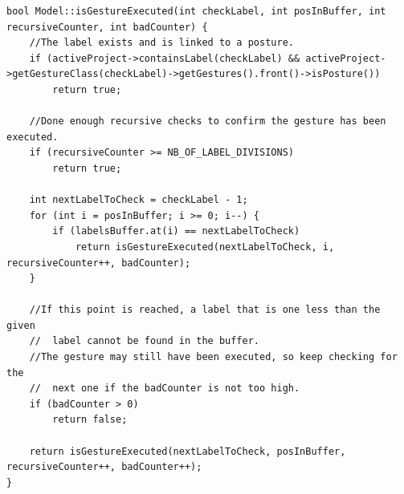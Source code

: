 \begin{lstlisting}[caption=method to verify if a gesture with given label is executed, label=code_gesture_executed]
bool Model::isGestureExecuted(int checkLabel, int posInBuffer, int recursiveCounter, int badCounter) {
	//The label exists and is linked to a posture.
	if (activeProject->containsLabel(checkLabel) && activeProject->getGestureClass(checkLabel)->getGestures().front()->isPosture())
		return true;

	//Done enough recursive checks to confirm the gesture has been executed.
	if (recursiveCounter >= NB_OF_LABEL_DIVISIONS)
		return true;

	int nextLabelToCheck = checkLabel - 1;
	for (int i = posInBuffer; i >= 0; i--) {
		if (labelsBuffer.at(i) == nextLabelToCheck)
			return isGestureExecuted(nextLabelToCheck, i, recursiveCounter++, badCounter);
	}

	//If this point is reached, a label that is one less than the given
	//	label cannot be found in the buffer.
	//The gesture may still have been executed, so keep checking for the
	//	next one if the badCounter is not too high.
	if (badCounter > 0)
		return false;
		
	return isGestureExecuted(nextLabelToCheck, posInBuffer, recursiveCounter++, badCounter++);
}
\end{lstlisting}